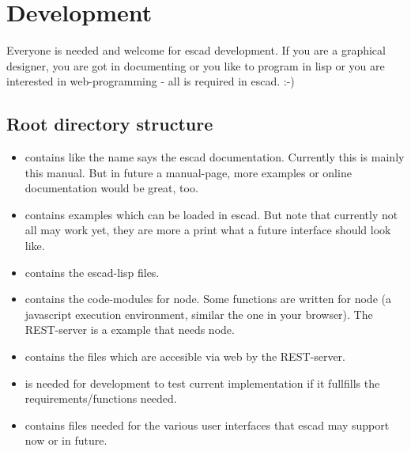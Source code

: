 \documentclass[a4paper, 12pt, openany]{scrbook}
\begin{document}
\chapter{Development}
Everyone is needed and welcome for escad development. If you are a graphical designer, you are got in documenting or you like to program in lisp or you are interested in web-programming - all is required in escad. :-)
\section{Root directory structure}
\begin{itemize}
\item {} contains like the name says the escad documentation. Currently this is mainly this manual. But in future a manual-page, more examples or online documentation would be great, too.
\item {} contains examples which can be loaded in escad. But note that currently not all may work yet, they are more a print what a future interface should look like.
\item {} contains the escad-lisp files.
\item {} contains the code-modules for node. Some functions are written for node (a javascript execution environment, similar the one in your browser). The REST-server is a example that needs node.
\item {} contains the files which are accesible via web by the REST-server.
\item {} is needed for development to test current implementation if it fullfills the requirements/functions needed.
\item {} contains files needed for the various user interfaces that escad may support now or in future.
\end{itemize}
\end{document}
